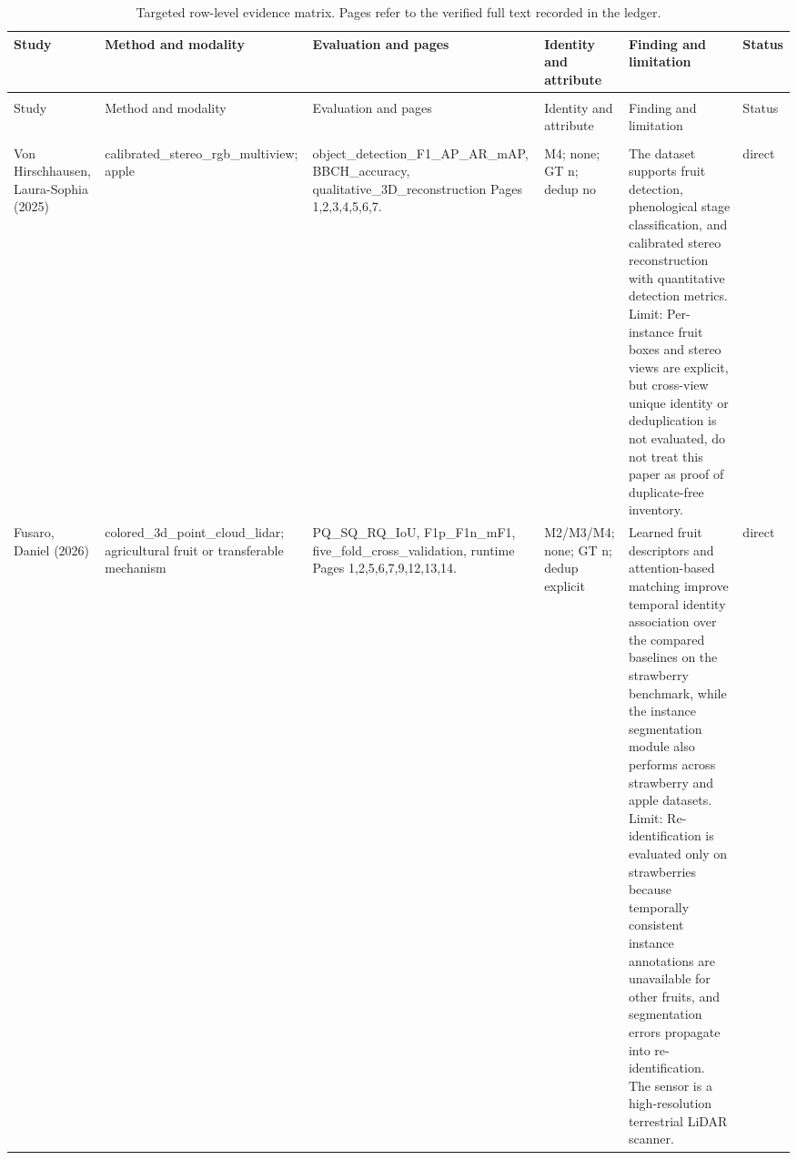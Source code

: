 \small
\setlength{\LTleft}{0pt}
\setlength{\LTright}{0pt}
\setlength{\tabcolsep}{2pt}
\makeatletter
{}
\makeatother
\begin{longtable}{@{}>{\raggedright\arraybackslash}p{}>{\raggedright\arraybackslash}p{}>{\raggedright\arraybackslash}p{}>{\raggedright\arraybackslash}p{}>{\raggedright\arraybackslash}p{}>{\raggedright\arraybackslash}p{}@{}}
\caption{Targeted row-level evidence matrix. Pages refer to the verified full text recorded in the ledger.}\label{tab:matrix3}\\
\toprule
Study & Method and modality & Evaluation and pages & Identity and attribute & Finding and limitation & Status\\
\midrule
\endfirsthead
\multicolumn{6}{c}{\tablename\ \thetable{} continued}\\
\toprule
Study & Method and modality & Evaluation and pages & Identity and attribute & Finding and limitation & Status\\
\midrule
\endhead
\midrule
\multicolumn{6}{r}{Continued on next page}\\
\endfoot
\bottomrule
\endlastfoot
Von Hirschhausen, Laura-Sophia (2025) \cite{ledger_m_3f8f02033fe9db3a} & calibrated\_\allowbreak{}stereo\_\allowbreak{}rgb\_\allowbreak{}multiview; apple & object\_\allowbreak{}detection\_\allowbreak{}F1\_\allowbreak{}AP\_\allowbreak{}AR\_\allowbreak{}mAP, BBCH\_\allowbreak{}accuracy, qualitative\_\allowbreak{}3D\_\allowbreak{}reconstruction Pages 1,2,3,4,5,6,7. & M4; none; GT n; dedup no & The dataset supports fruit detection, phenological stage classification, and calibrated stereo reconstruction with quantitative detection metrics. Limit: Per-instance fruit boxes and stereo views are explicit, but cross-view unique identity or deduplication is not evaluated, do not treat this paper as proof of duplicate-free inventory. & direct\\
Fusaro, Daniel (2026) \cite{ledger_r_0eda6374aaf85fae} & colored\_\allowbreak{}3d\_\allowbreak{}point\_\allowbreak{}cloud\_\allowbreak{}lidar; agricultural fruit or transferable mechanism & PQ\_\allowbreak{}SQ\_\allowbreak{}RQ\_\allowbreak{}IoU, F1p\_\allowbreak{}F1n\_\allowbreak{}mF1, five\_\allowbreak{}fold\_\allowbreak{}cross\_\allowbreak{}validation, runtime Pages 1,2,5,6,7,9,12,13,14. & M2/M3/M4; none; GT n; dedup explicit & Learned fruit descriptors and attention-based matching improve temporal identity association over the compared baselines on the strawberry benchmark, while the instance segmentation module also performs across strawberry and apple datasets. Limit: Re-identification is evaluated only on strawberries because temporally consistent instance annotations are unavailable for other fruits, and segmentation errors propagate into re-identification. The sensor is a high-resolution terrestrial LiDAR scanner. & direct\\

\end{longtable}
